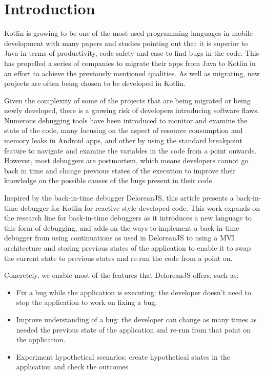 
\chapter{Introduction}
\label{cha:introduction}
Kotlin is growing to be one of the most used programming languages in mobile development with many papers and studies pointing out that it is superior to Java in terms of productivity, code safety and ease to find bugs in the code. This has propelled a series of companies to migrate their apps from Java to Kotlin in an effort to achieve the previously mentioned qualities. As well as migrating, new projects are often being chosen to be developed in Kotlin. 

Given the complexity of some of the projects that are being migrated or being newly developed, there is a growing risk of developers introducing software flaws.  Numerous debugging tools have been introduced to monitor and examine the state of the code, many focusing on the aspect of resource consumption and memory leaks in Android apps, and other by using the standard breakpoint feature to navigate and examine the variables in the code from a point onwards. However, most debuggers are postmortem, which means developers cannot go back in time and change previous states of the execution to improve their knowledge on the possible causes of the bugs present in their code. 

Inspired by the back-in-time debugger DeloreanJS, this article presents a back-in-time debugger for Kotlin for reactive style developed code. This work expands on the research line for back-in-time debuggers as it introduces a new language to this form of debugging, and adds on the ways to implement a back-in-time debugger from using continuations as used in DeloreanJS to using a MVI architecture and storing previous states of the application to enable it to swap the current state to previous states and re-run the code from a point on.

Concretely, we enable most of the features that DeloreanJS offers, such as:
\begin{itemize}
    \item Fix a bug while the application is executing: the developer doesn’t need to stop the application to work on fixing a bug.
    \item Improve understanding of a bug: the developer can change as many times as needed the previous state of the application and re-run from that point on the application.
    \item Experiment hypothetical scenarios: create hypothetical states in the application and check the outcomes
\end{itemize}

